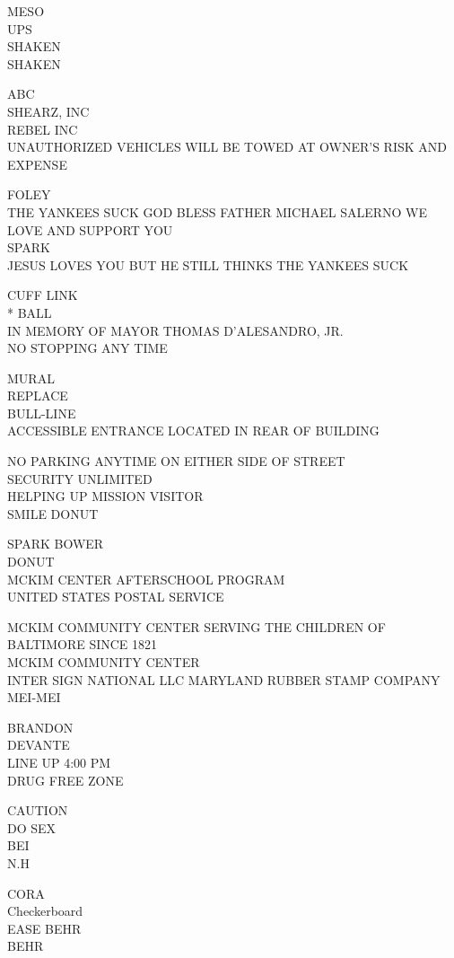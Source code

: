 \documentclass[10pt,letterpaper]{article}
\begin{document}
MESO\\
UPS\\
SHAKEN\\
SHAKEN

ABC\\
SHEARZ, INC\\
REBEL INC\\
UNAUTHORIZED VEHICLES WILL BE TOWED AT OWNER'S RISK AND EXPENSE

FOLEY\\
THE YANKEES SUCK GOD BLESS FATHER MICHAEL SALERNO WE LOVE AND SUPPORT YOU\\
SPARK\\
JESUS LOVES YOU BUT HE STILL THINKS THE YANKEES SUCK

CUFF LINK\\
* BALL\\
IN MEMORY OF MAYOR THOMAS D'ALESANDRO, JR.\\
NO STOPPING ANY TIME

MURAL\\
REPLACE\\
BULL{-}LINE\\
ACCESSIBLE ENTRANCE LOCATED IN REAR OF BUILDING

NO PARKING ANYTIME ON EITHER SIDE OF STREET\\
SECURITY UNLIMITED\\
HELPING UP MISSION VISITOR\\
SMILE DONUT

SPARK BOWER\\
DONUT\\
MCKIM CENTER AFTERSCHOOL PROGRAM\\
UNITED STATES POSTAL SERVICE

MCKIM COMMUNITY CENTER SERVING THE CHILDREN OF BALTIMORE SINCE 1821\\
MCKIM COMMUNITY CENTER\\
INTER SIGN NATIONAL LLC MARYLAND RUBBER STAMP COMPANY\\
MEI{-}MEI

BRANDON\\
DEVANTE\\
LINE UP 4:00 PM\\
DRUG FREE ZONE

CAUTION\\
DO SEX\\
BEI\\
N.H

CORA\\
Checkerboard\\
EASE BEHR\\
BEHR
\end{document}
